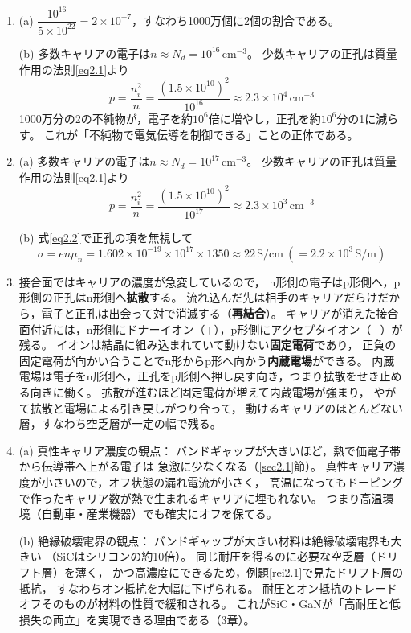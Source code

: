 \answer
\begin{enumerate}

\item[\ref{ex2.1}]
(a) $\dfrac{10^{16}}{5\times10^{22}} = 2\times10^{-7}$，すなわち1000万個に2個の割合である。

(b) 多数キャリアの電子は$n \approx N_d = 10^{16}\,\mathrm{cm^{-3}}$。
少数キャリアの正孔は質量作用の法則\ref{eq2.1}より
\begin{equation*}
p = \frac{n_i^2}{n} = \frac{(1.5\times10^{10})^2}{10^{16}}
\approx 2.3\times10^{4}\,\mathrm{cm^{-3}}
\end{equation*}
1000万分の2の不純物が，電子を約$10^6$倍に増やし，正孔を約$10^6$分の1に減らす。
これが「不純物で電気伝導を制御できる」ことの正体である。

\item[\ref{ex2.2}]
(a) 多数キャリアの電子は$n \approx N_d = 10^{17}\,\mathrm{cm^{-3}}$。
少数キャリアの正孔は質量作用の法則\ref{eq2.1}より
\begin{equation*}
p = \frac{n_i^2}{n} = \frac{(1.5\times10^{10})^2}{10^{17}}
\approx 2.3\times10^{3}\,\mathrm{cm^{-3}}
\end{equation*}

(b) 式\ref{eq2.2}で正孔の項を無視して
\begin{equation*}
\sigma = e n \mu_n = 1.602\times10^{-19}\times10^{17}\times1350
\approx 22\,\mathrm{S/cm}\ (= 2.2\times10^{3}\,\mathrm{S/m})
\end{equation*}

\item[\ref{ex2.3}]
接合面ではキャリアの濃度が急変しているので，
n形側の電子はp形側へ，p形側の正孔はn形側へ\textbf{拡散}する。
流れ込んだ先は相手のキャリアだらけだから，電子と正孔は出会って対で消滅する（\textbf{再結合}）。
キャリアが消えた接合面付近には，n形側にドナーイオン（$+$），p形側にアクセプタイオン（$-$）が残る。
イオンは結晶に組み込まれていて動けない\textbf{固定電荷}であり，
正負の固定電荷が向かい合うことでn形からp形へ向かう\textbf{内蔵電場}ができる。
内蔵電場は電子をn形側へ，正孔をp形側へ押し戻す向き，つまり拡散をせき止める向きに働く。
拡散が進むほど固定電荷が増えて内蔵電場が強まり，
やがて拡散と電場による引き戻しがつり合って，
動けるキャリアのほとんどない層，すなわち空乏層が一定の幅で残る。

\item[\ref{ex2.4}]
(a) 真性キャリア濃度の観点：
バンドギャップが大きいほど，熱で価電子帯から伝導帯へ上がる電子は
急激に少なくなる（\ref{sec2.1}節）。
真性キャリア濃度が小さいので，オフ状態の漏れ電流が小さく，
高温になってもドーピングで作ったキャリア数が熱で生まれるキャリアに埋もれない。
つまり高温環境（自動車・産業機器）でも確実にオフを保てる。

(b) 絶縁破壊電界の観点：
バンドギャップが大きい材料は絶縁破壊電界も大きい
（SiCはシリコンの約10倍）。
同じ耐圧を得るのに必要な空乏層（ドリフト層）を薄く，
かつ高濃度にできるため，例題\ref{rei2.1}で見たドリフト層の抵抗，
すなわちオン抵抗を大幅に下げられる。
耐圧とオン抵抗のトレードオフそのものが材料の性質で緩和される。
これがSiC・GaNが「高耐圧と低損失の両立」を実現できる理由である（3章）。

\end{enumerate}
